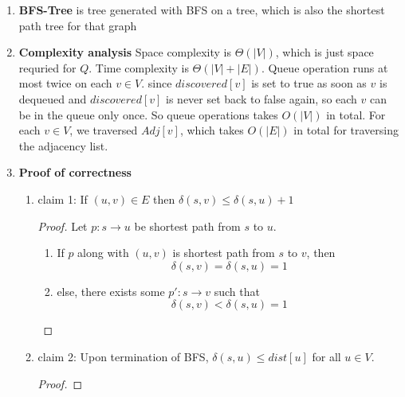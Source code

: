\documentclass[11pt]{article}
\begin{document}
\begin{defn*}
\begin{enumerate}
\begin{algorithm}[H]
{          $Q \leftarrow \O$ be a queue \\
          $\enqueue(Q, s)$ \\
       }
     \end{algorithm}
     \item \textbf{BFS-Tree} is tree generated with BFS on a tree, which is also the shortest path tree for that graph
     \item \textbf{Complexity analysis} Space complexity is $\Theta(|V|)$, which is just space requried for $Q$. Time complexity is $\Theta(|V| + |E|)$. Queue operation runs at most twice on each $v\in V$. since $discovered[v]$ is set to true as soon as $v$ is dequeued and $discovered[v]$ is never set back to false again, so each $v$ can be in the queue only once. So queue operations takes $O(|V|)$ in total. For each $v\in V$, we traversed $Adj[v]$, which takes $O(|E|)$ in total for traversing the adjacency list.
     \item \textbf{Proof of correctness}
     \begin{enumerate}
       \item claim 1: If $(u,v)\in E$ then $\delta(s, v) \leq \delta(s, u) + 1$
       \begin{proof}
         Let $p: s\to u$ be shortest path from $s$ to $u$.
         \begin{enumerate}
           \item If $p$ along with $(u,v)$ is shortest path from $s$ to $v$, then
           \[
            \delta(s, v) = \delta(s, u) = 1
           \]
           \item else, there exists some $p': s\to v$ such that
           \[
            \delta(s, v) < \delta(s, u) = 1
           \]
         \end{enumerate}
       \end{proof}
       \item claim 2: Upon termination of BFS, $\delta(s, u) \leq dist[u]$ for all $u\in V$.
       \begin{proof}

\end{proof}
\end{enumerate}
\end{enumerate}
\end{defn*}
\end{document}
